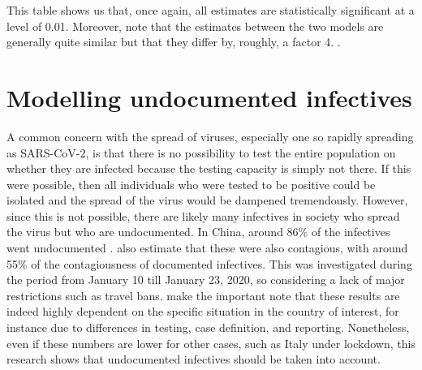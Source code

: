 \documentclass[12pt]{article}
\begin{document}
	This table shows us that, once again, all estimates are statistically significant at a level of 0.01. Moreover, note that the estimates between the two models are generally quite similar but that they differ by, roughly, a factor 4. .
	
	
	
	\section{Modelling undocumented infectives} \label{sec:undocumented_modelling}
	A common concern with the spread of viruses, especially one so rapidly spreading as SARS-CoV-2, is that there is no possibility to test the entire population on whether they are infected because the testing capacity is simply not there. If this were possible, then all individuals who were tested to be positive could be isolated and the spread of the virus would be dampened tremendously. However, since this is not possible, there are likely many infectives in society who spread the virus but who are undocumented. In China, around 86\% of the infectives went undocumented \parencite{li2020undocumented}. \textcite{li2020undocumented} also estimate that these were also contagious, with around 55\% of the contagiousness of documented infectives. This was investigated during the period from January 10 till January 23, 2020, so considering a lack of major restrictions such as travel bans. \textcite{li2020undocumented} make the important note that these results are indeed highly dependent on the specific situation in the country of interest, for instance due to differences in testing, case definition, and reporting. Nonetheless, even if these numbers are lower for other cases, such as Italy under lockdown, this research shows that undocumented infectives should be taken into account. \\
	
\end{document}
